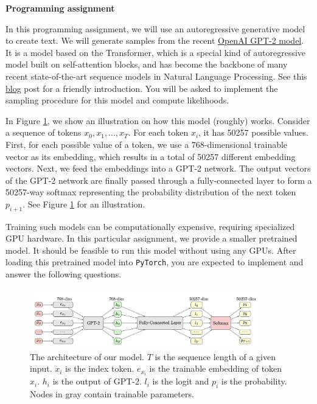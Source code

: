 \item {\bf Programming assignment}

In this programming assignment, we will use an autoregressive generative model to create text. We will 
generate samples from the recent \href{https://openai.com/research/better-language-models}{OpenAI GPT-2 model}. 
It is a model based on the Transformer, which is a  special kind of autoregressive model built on self-attention blocks, and 
has become the backbone of many recent state-of-the-art sequence models in Natural Language Processing. 
See this \href{https://jalammar.github.io/illustrated-transformer/}{blog} post for a friendly introduction. You will be asked to implement the sampling procedure for this model and compute likelihoods. 

In Figure \ref{fig:gpt}, we show an illustration on how this model (roughly) works. Consider a sequence of tokens $x_0,x_1,...,x_T$. 
For each token $x_i$, it has 50257 possible values. First, for each possible value of a token, we use a 768-dimensional 
trainable vector as its embedding, which results in a total of 50257 different embedding vectors. Next, we feed 
the embeddings into a GPT-2 network. The output vectors of the GPT-2 network are finally passed through a fully-connected 
layer to form a 50257-way softmax representing the probability distribution of the next token $p_{i+1}$. See Figure \ref{fig:gpt} for an illustration.

Training such models can be computationally expensive, requiring specialized GPU hardware. In this particular assignment, 
we provide a smaller pretrained model. It should be feasible to run this model without using any GPUs. 
After loading this pretrained model into \texttt{PyTorch}, you are expected to implement and answer the following questions.

\begin{figure}[h]
    \centering
    \includegraphics[width=0.9\textwidth]{./figures/gpt-2}
    \caption{The architecture of our model. $T$ is the sequence length of a given input. $x_i$ is the index token. $e_{x_{i}}$ is the trainable embedding of token $x_i$. $h_i$ is the output of GPT-2. $l_i$ is the logit and $p_i$ is the probability. Nodes in gray contain trainable parameters.}
    \label{fig:gpt}
\end{figure}


